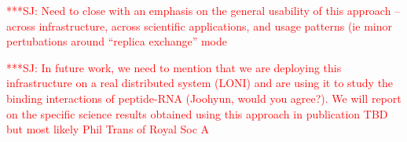 \documentclass[times, 10pt,twocolumn]{article}
\newcommand{\jhanote}[1]{ {\textcolor{red} { ***SJ: #1 }}}
\begin{document}
\jhanote{Need to close with an emphasis on the general usability of
  this approach -- across infrastructure, across scientific
  applications, and usage patterns (ie minor pertubations around
  ``replica exchange'' mode}

\jhanote{In future work, we need to mention that we are deploying this
  infrastructure on a real distributed system (LONI) and are using it
  to study the binding interactions of peptide-RNA (Joohyun, would you
  agree?). We will report on the specific science results obtained
  using this approach in publication TBD but most likely Phil Trans of
  Royal Soc A}



\end{document}

